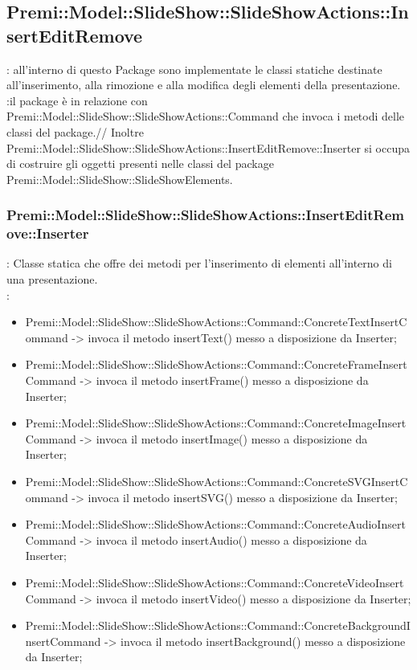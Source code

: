 	\subsection{Premi::Model::SlideShow::SlideShowActions::InsertEditRemove}{
		\textbf{\tipo}: all’interno di questo Package sono implementate le classi statiche destinate all'inserimento, alla rimozione e alla modifica degli elementi della presentazione.\\
		\textbf{\relaz}:il package è in relazione con Premi::Model::SlideShow::SlideShowActions::Command che invoca i metodi delle classi del package.//
        Inoltre Premi::Model::SlideShow::SlideShowActions::InsertEditRemove::Inserter si occupa di costruire gli oggetti presenti nelle classi del package Premi::Model::SlideShow::SlideShowElements.
	
	\subsubsection{Premi::Model::SlideShow::SlideShowActions::InsertEditRemove::Inserter}{
		\textbf{\tipo}: Classe statica che offre dei metodi per l’inserimento di elementi all’interno di una presentazione.\\	
		\textbf{\relaz}:
		\begin{itemize}
			\item Premi::Model::SlideShow::SlideShowActions::Command::ConcreteTextInsertCommand -> invoca il metodo insertText() messo a disposizione da Inserter;
			\item Premi::Model::SlideShow::SlideShowActions::Command::ConcreteFrameInsertCommand -> invoca il metodo insertFrame() messo a disposizione da Inserter;
			\item Premi::Model::SlideShow::SlideShowActions::Command::ConcreteImageInsertCommand -> invoca il metodo insertImage() messo a disposizione da Inserter;
			\item Premi::Model::SlideShow::SlideShowActions::Command::ConcreteSVGInsertCommand -> invoca il metodo insertSVG() messo a disposizione da Inserter;
			\item Premi::Model::SlideShow::SlideShowActions::Command::ConcreteAudioInsertCommand -> invoca il metodo insertAudio() messo a disposizione da Inserter;
			\item Premi::Model::SlideShow::SlideShowActions::Command::ConcreteVideoInsertCommand -> invoca il metodo insertVideo() messo a disposizione da Inserter;
			\item Premi::Model::SlideShow::SlideShowActions::Command::ConcreteBackgroundInsertCommand -> invoca il metodo insertBackground() messo a disposizione da Inserter;

\end{itemize}}}
